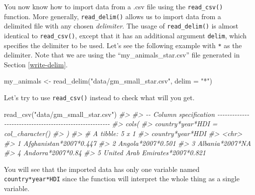 \documentclass[
]{book}
\newenvironment{Shaded}{\begin{snugshade}}{\end{snugshade}}
\newcommand{\AttributeTok}[1]{\textcolor[rgb]{0.77,0.63,0.00}{#1}}
\newcommand{\CommentTok}[1]{\textcolor[rgb]{0.56,0.35,0.01}{\textit{#1}}}
\newcommand{\FunctionTok}[1]{\textcolor[rgb]{0.00,0.00,0.00}{#1}}
\newcommand{\NormalTok}[1]{#1}
\newcommand{\OtherTok}[1]{\textcolor[rgb]{0.56,0.35,0.01}{#1}}
\newcommand{\StringTok}[1]{\textcolor[rgb]{0.31,0.60,0.02}{#1}}
\begin{document}
You now know how to import data from a .csv file using the \texttt{read\_csv()} function. More generally, \texttt{read\_delim()} allows us to import data from a delimited file with any chosen \emph{delimiter}. The usage of \texttt{read\_delim()} is almost identical to \texttt{read\_csv()}, except that it has an additional argument \texttt{delim}, which specifies the delimiter to be used. Let's see the following example with \texttt{*} as the delimiter. Note that we are using the ``my\_animals\_star.csv'' file generated in Section \ref{write-delim}.

\begin{Shaded}
\begin{Highlighting}[]
\NormalTok{my\_animals }\OtherTok{\textless{}{-}} \FunctionTok{read\_delim}\NormalTok{(}\StringTok{"data/gm\_small\_star.csv"}\NormalTok{, }\AttributeTok{delim =} \StringTok{"*"}\NormalTok{)}
\end{Highlighting}
\end{Shaded}

Let's try to use \texttt{read\_csv()} instead to check what will you get.

\begin{Shaded}
\begin{Highlighting}[]
\FunctionTok{read\_csv}\NormalTok{(}\StringTok{"data/gm\_small\_star.csv"}\NormalTok{)}
\CommentTok{\#\textgreater{} }
\CommentTok{\#\textgreater{} {-}{-} Column specification {-}{-}{-}{-}{-}{-}{-}{-}{-}{-}{-}{-}{-}{-}{-}{-}{-}{-}{-}{-}{-}{-}{-}{-}{-}{-}{-}{-}{-}{-}{-}{-}{-}{-}{-}{-}{-}{-}{-}{-}{-}{-}{-}{-}{-}{-}{-}{-}{-}{-}{-}{-}{-}{-}{-}{-}}
\CommentTok{\#\textgreater{} cols(}
\CommentTok{\#\textgreater{}   \textasciigrave{}country*year*HDI\textasciigrave{} = col\_character()}
\CommentTok{\#\textgreater{} )}
\CommentTok{\#\textgreater{} \# A tibble: 5 x 1}
\CommentTok{\#\textgreater{}   \textasciigrave{}country*year*HDI\textasciigrave{}             }
\CommentTok{\#\textgreater{}   \textless{}chr\textgreater{}                          }
\CommentTok{\#\textgreater{} 1 Afghanistan*2007*0.447         }
\CommentTok{\#\textgreater{} 2 Angola*2007*0.501              }
\CommentTok{\#\textgreater{} 3 Albania*2007*NA                }
\CommentTok{\#\textgreater{} 4 Andorra*2007*0.84              }
\CommentTok{\#\textgreater{} 5 United Arab Emirates*2007*0.821}
\end{Highlighting}
\end{Shaded}

You will see that the imported data has only one variable named \texttt{country*year*HDI} since the function will interpret the whole thing as a single variable.
\end{document}
